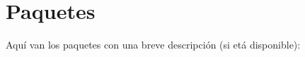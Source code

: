 \section{Paquetes}
Aquí van los paquetes con una breve descripción (si etá disponible)\-:\begin{DoxyCompactList}
\item{}
\end{DoxyCompactList}
